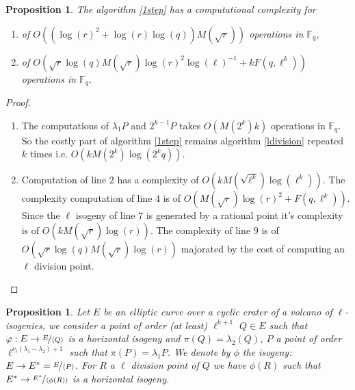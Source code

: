 \documentclass{lms}
\newtheorem{prop}[thm]{Proposition}
\begin{document}
\begin{prop}
The algorithm \ref{1step} has a computational complexity for
\begin{enumerate}
\item[$\ell =2$] of $O((\log(r)^2+\log(r)\log(q))M(\sqrt{r}))$ operations in $\mathbb{F}_q$,
 \item[$\ell \neq 2$] of $O(\sqrt{r}\log(q)M(\sqrt{r})\log(r)^2 \log(\ell)^{-1}+kF(q,\ell^k))$ operations in $\mathbb{F}_q$.
 
\end{enumerate}
\end{prop}

\begin{proof}
\begin{enumerate}
\item[$\ell=2$] The computations of $\lambda_1P$ and $2^{k-1}P$ takes  $O(M(2^k)k)$ operations in $\mathbb{F}_q$. So the costly part of algorithm \ref{1step} remains algorithm \ref{ldivision} repeated $k$ times i.e. $O(kM(2^k)\log(2^kq))$. 
\item[$\ell \neq 2$] Computation of line $2$ has a complexity of $O(kM(\sqrt{\ell^k})\log(\ell^k))$. The complexity computation of line $4$ is of $O(M(\sqrt{r})\log(r)^2+ F(q,\ell^k))$. Since the $\ell$ isogeny of line $7$ is generated by a rational point it's complexity is of $O(kM(\sqrt{r})\log(r))$. The complexity of line $9$ is of $O(\sqrt{r}\log(q)M(\sqrt{r})\log(r))$ majorated by the cost of computing an $\ell$ division point.
\end{enumerate} 
\end{proof}

\begin{prop}\label{propcentrale}
Let $E$ be an elliptic curve over a cyclic crater of a volcano of $\ell$-isogenies, we consider a  point of order (at least) $\ell^{h+1}$ $Q \in E$ such that $\varphi: E \rightarrow \nicefrac{E}{\langle Q \rangle }$ is a horizontal isogeny and $\pi(Q)=\lambda_2(Q)$, $P$ a point of order $\ell^{\nu_{\ell}(\lambda_1-\lambda_2)+1}$ such that $\pi(P) = \lambda_1P$. We denote by $\phi$ the isogeny: $E\rightarrow E^*=\nicefrac{E}{\langle P \rangle}$. For $R$ a $\ell$ division point of $Q$ we have $\phi(R)$ such that $E^* \rightarrow \nicefrac{E^*}{\langle \phi(R) \rangle}$ is a horizontal isogeny.  
\end{prop}
\end{document}
